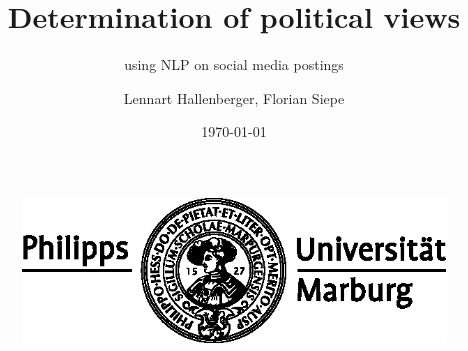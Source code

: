 \documentclass[aspectratio=169,xcolor=dvipsnames]{beamer}
\title[Determination of political views]{Determination of political views}
\subtitle{using NLP on social media postings}
\author[Lennart Hallenberger, Florian Siepe]{Lennart Hallenberger, Florian Siepe}
\institute[] %
{
    Department Mathematics and Computer Science \\
    Philipps University of Marburg
    \vskip 3pt
}
\date{\today} %
\begin{document}
\begin{frame}[plain]
    \titlepage
    \begin{figure}[h]
        \includegraphics[scale=0.5]{images/uni_logo_schwarz.eps}
    \end{figure}
\end{frame}
\end{document}
